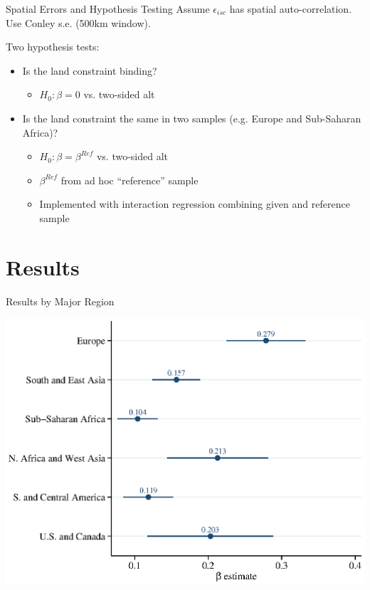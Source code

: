 \documentclass[10pt, xcolor=dvipsnames]{beamer}
\begin{document}
\begin{frame}{Spatial Errors and Hypothesis Testing}\label{testing}
Assume $\epsilon_{isc}$ has spatial auto-correlation. Use Conley s.e. (500km window). 

\vspace{.2cm} Two hypothesis tests:
\begin{itemize}
  \item Is the land constraint binding? 
    \begin{itemize}
      \item $H_0: \beta=0$ vs. two-sided alt 
    \end{itemize}
  \item Is the land constraint the same in two samples (e.g. Europe and Sub-Saharan Africa)? 
    \begin{itemize}
      \item $H_0: \beta = \beta^{Ref}$ vs. two-sided alt 
      \item $\beta^{Ref}$ from ad hoc ``reference'' sample
      \item Implemented with interaction regression combining given and reference sample
    \end{itemize}
\end{itemize}
\hfill \hyperlink{interaction}{}
\end{frame}

\section{Results}

\begin{frame}{Results by Major Region}\label{region}
\begin{center}
\includegraphics[width=.8\textwidth]{fig_coef_region.eps}
\end{center}
\hfill \hyperlink{regiontab}{}
\end{frame}
\end{document}
